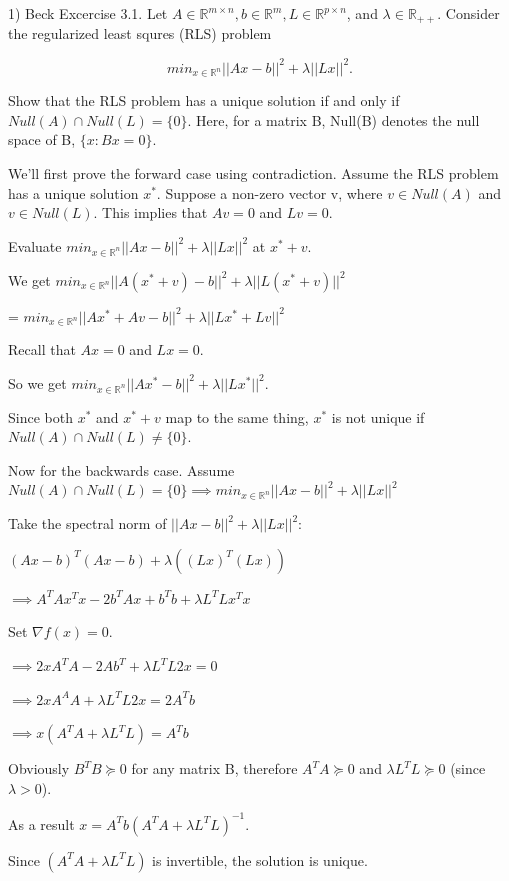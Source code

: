 \documentclass{article}
\newcommand{\RR}{\mathbb{R}}
\begin{document}
1) Beck Excercise 3.1. Let $A \in \RR^{m \times n}, b \in \RR^m, L \in \RR^{p \times n}$,
and $\lambda \in \RR_{++}$. Consider the regularized least squres (RLS) problem

\[min_{x \in \RR^n} ||Ax - b||^2 + \lambda ||Lx||^2.\]

Show that the RLS problem has a unique solution if and only if $Null(A) \cap Null(L) = \{0\}$.
Here, for a matrix B, Null(B) denotes the null space of B, $\{x : Bx = 0\}$.


We'll first prove the forward case using contradiction.
Assume the RLS problem has a unique solution $x^{*}$.
Suppose a non-zero vector v, where $v \in Null(A)$ and $v \in Null(L)$.
This implies that $Av = 0$ and $Lv = 0$.

Evaluate $min_{x \in \RR^n} ||Ax - b||^2 + \lambda ||Lx||^2$ at $x^{*} + v$.

We get $min_{x \in \RR^n} ||A(x^{*} + v) - b||^2 + \lambda ||L(x^{*} + v)||^2$

= $min_{x \in \RR^n} ||Ax^{*} + Av - b||^2 + \lambda ||Lx^{*} + Lv||^2$

Recall that $Ax = 0$ and $Lx = 0$.

So we get $min_{x \in \RR^n} ||Ax^{*} - b||^2 + \lambda ||Lx^{*}||^2$.

Since both $x^{*}$ and $x^{*} + v$ map to the same thing, $x^{*}$ is not unique
if $Null(A) \cap Null(L) \neq \{0\}$.


Now for the backwards case.
Assume $Null(A) \cap Null(L) = \{0\} \implies min_{x \in \RR^n} ||Ax - b||^2 + \lambda ||Lx||^2$

Take the spectral norm of $||Ax - b||^2 + \lambda ||Lx||^2$:

$(Ax - b)^T (Ax - b) + \lambda ((Lx)^T (Lx))$

$\implies A^T A x^T x - 2 b^T A x + b^T b + \lambda L^T L x^T x$

Set $\nabla f(x) = 0$.

$\implies 2 x A^T A - 2 A b^T + \lambda L^T L 2 x = 0$

$\implies 2 x A^A A + \lambda L^T L 2 x = 2 A^T b$

$\implies x(A^T A + \lambda L^T L) = A^T b$

Obviously $B^T B \succeq 0$ for any matrix B,
therefore $A^T A \succeq 0$ and $\lambda L^T L \succeq 0$ (since $\lambda > 0$).

As a result $x = A^T b (A^T A + \lambda L^T L)^{-1}$.

Since $(A^T A + \lambda L^T L)$ is invertible, the solution is unique.
\end{document}
